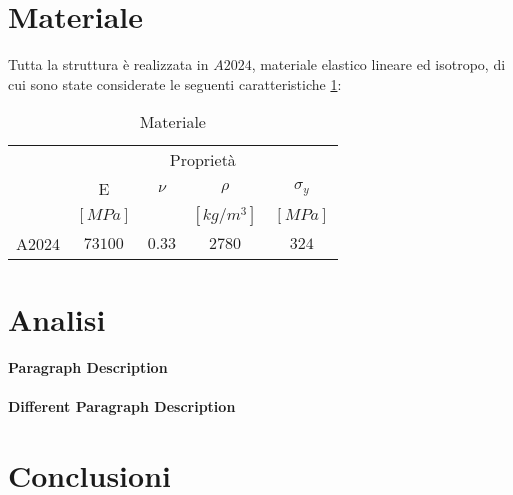 \documentclass[
10pt, %
a4paper, %
oneside, %
headinclude,footinclude, %
BCOR5mm, %
]{scrartcl}
\begin{document}
\section{Materiale}

Tutta la struttura è realizzata in $A2024$, materiale elastico lineare ed isotropo, di cui sono state considerate le seguenti caratteristiche \ref{tab:mat}:

\begin{table}[hbt]
	\caption{Materiale}
	\centering
	\begin{tabular}{lcccc}
		\toprule
		& \multicolumn{4}{c}{Proprietà} \\
		\cmidrule(r){2-5}
		& E & $\nu$ & $\rho$ & $\sigma_y$  \\
		& $[MPa]$ &  & $[kg/m^3]$ & $[MPa]$  \\
		\midrule
		A2024 & $73100$ & $0.33$ & $2780$ & $324$ \\
		\bottomrule
	\end{tabular}
	\label{tab:mat}
\end{table}


\section{Analisi}




\newpage


\paragraph{Paragraph Description} \lipsum[7] %

\paragraph{Different Paragraph Description} \lipsum[8] %




\section{Conclusioni}


\end{document}
